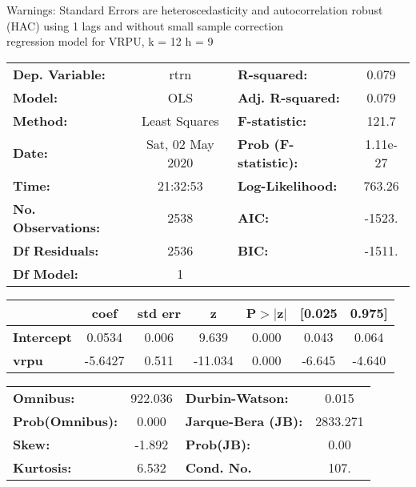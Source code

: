 Warnings: \newline
 [1] Standard Errors are heteroscedasticity and autocorrelation robust (HAC) using 1 lags and without small sample correction\\ 

regression model for VRPU, k = 12 h = 9\begin{center}
\begin{tabular}{lclc}
\toprule
\textbf{Dep. Variable:}    &       rtrn       & \textbf{  R-squared:         } &     0.079   \\
\textbf{Model:}            &       OLS        & \textbf{  Adj. R-squared:    } &     0.079   \\
\textbf{Method:}           &  Least Squares   & \textbf{  F-statistic:       } &     121.7   \\
\textbf{Date:}             & Sat, 02 May 2020 & \textbf{  Prob (F-statistic):} &  1.11e-27   \\
\textbf{Time:}             &     21:32:53     & \textbf{  Log-Likelihood:    } &    763.26   \\
\textbf{No. Observations:} &        2538      & \textbf{  AIC:               } &    -1523.   \\
\textbf{Df Residuals:}     &        2536      & \textbf{  BIC:               } &    -1511.   \\
\textbf{Df Model:}         &           1      & \textbf{                     } &             \\
\bottomrule
\end{tabular}
\begin{tabular}{lcccccc}
                   & \textbf{coef} & \textbf{std err} & \textbf{z} & \textbf{P$> |$z$|$} & \textbf{[0.025} & \textbf{0.975]}  \\
\midrule
\textbf{Intercept} &       0.0534  &        0.006     &     9.639  &         0.000        &        0.043    &        0.064     \\
\textbf{vrpu}      &      -5.6427  &        0.511     &   -11.034  &         0.000        &       -6.645    &       -4.640     \\
\bottomrule
\end{tabular}
\begin{tabular}{lclc}
\textbf{Omnibus:}       & 922.036 & \textbf{  Durbin-Watson:     } &    0.015  \\
\textbf{Prob(Omnibus):} &   0.000 & \textbf{  Jarque-Bera (JB):  } & 2833.271  \\
\textbf{Skew:}          &  -1.892 & \textbf{  Prob(JB):          } &     0.00  \\
\textbf{Kurtosis:}      &   6.532 & \textbf{  Cond. No.          } &     107.  \\
\bottomrule
\end{tabular}
\end{center}

